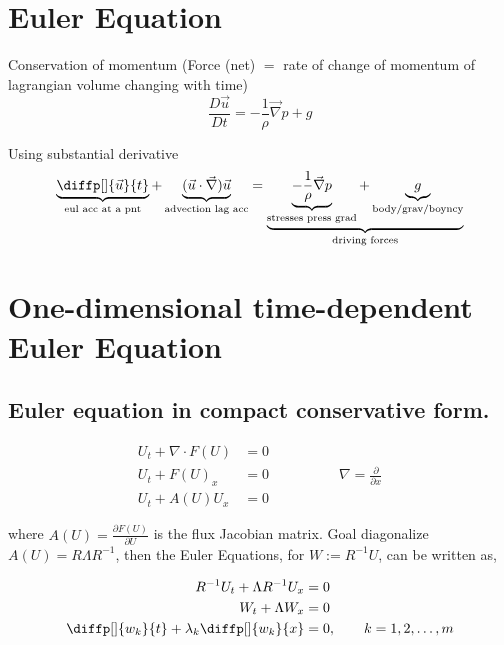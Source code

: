 
\subsectionfont{\fontsize{10}{10}\selectfont}

\section{Euler Equation}%

Conservation of momentum (Force (net) $=$ rate of change of momentum of
lagrangian volume changing with time)
\begin{equation}
  \frac{D \vec{u}}{Dt} = - \frac{1}{ \rho}\vec{\nabla}p + g 
\end{equation}

Using substantial derivative
\begin{equation}
  \underbrace{\diffp[]{\vec{u}}{t}}_\text{eul acc at
    a pnt} + \underbrace{( \vec{u}\cdot \vec{\nabla}
    ) \vec{u}}_\text{advection lag acc} = \underbrace{
  \underbrace{-\frac{1}{\rho}\vec{\nabla}p}_\text{stresses press grad} + \underbrace{g}_\text{body/grav/boyncy}}_\text{driving forces}
\end{equation}


\section{One-dimensional time-dependent Euler Equation}%
\subsection{Euler equation in compact conservative form. }%

\begin{align}
  U_{t} + \nabla\cdot F(U) &= 0 \\
  U_{t} + F(U)_{x} &= 0 \qquad\qquad\quad\nabla = \frac{\partial}{\partial x}\\
  U_{t} + A(U)U_{x} &= 0
\end{align}

where $A(U) = \frac{\partial{F(U)}}{\partial{U}}$ is the flux Jacobian matrix.
Goal diagonalize $A(U) = R\Lambda R^{-1}$, then the Euler Equations, for $W := R^{-1}U$, can be
written as,

\begin{align}
  R^{-1}U_{t} + \Lambda R^{-1}U_{x} &= 0 \\
  W_{t} + \Lambda W_{x} &= 0 \\
  \diffp[]{w_{k}}{t} + \lambda_{k} \diffp[]{w_{k}}{x} &= 0, \qquad k=1,2,\dots,m
\end{align}

